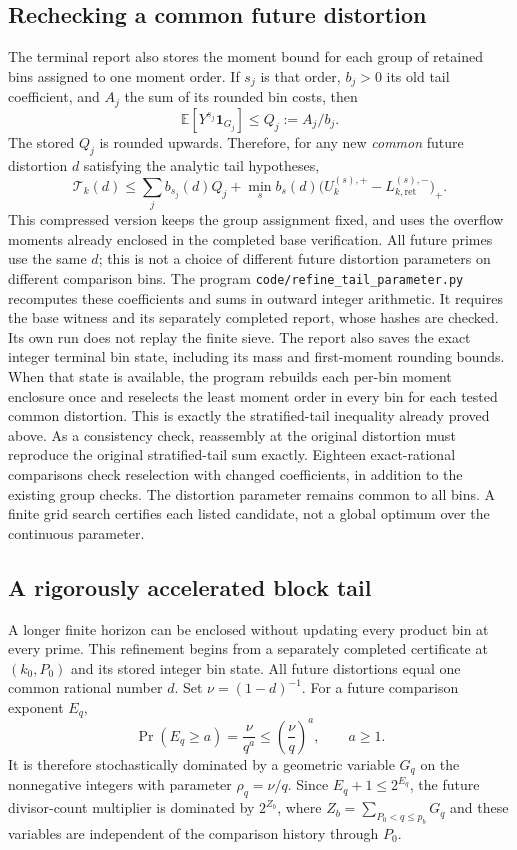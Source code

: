 \documentclass[11pt]{article}
\newcommand{\E}{\mathbb E}
\begin{document}
\subsection{Rechecking a common future distortion}
The terminal report also stores the moment bound for each group of retained
bins assigned to one moment order. If $s_j$ is that order, $b_j>0$ its
old tail coefficient, and $A_j$ the sum of its rounded bin costs, then
\[
 \E[Y^{s_j}\mathbf1_{G_j}]\leq Q_j:=A_j/b_j.
\]
The stored $Q_j$ is rounded upwards. Therefore, for any new \emph{common}
future distortion $d$ satisfying the analytic tail hypotheses,
\[
 \mathcal T_k(d)\leq\sum_j b_{s_j}(d)Q_j+
 \min_s b_s(d)\bigl(U_k^{(s),+}-L_{k,\mathrm{ret}}^{(s),-}\bigr)_+.
\]
This compressed version keeps the group assignment fixed, and uses the
overflow moments already enclosed in the completed base verification. All future primes
use the same $d$; this is not a choice of different future distortion
parameters on different comparison bins. The program
\texttt{code/refine\_tail\_parameter.py} recomputes these coefficients
and sums in outward integer arithmetic. It requires the base witness and
its separately completed report, whose hashes are checked. Its own run
does not replay the finite sieve. The report also saves the exact integer terminal bin state, including its
mass and first-moment rounding bounds. When that state is available, the
program rebuilds each per-bin moment enclosure once and reselects the least
moment order in every bin for each tested common distortion. This is exactly
the stratified-tail inequality already proved above. As a consistency check,
reassembly at the original distortion must reproduce the original
stratified-tail sum exactly. Eighteen exact-rational comparisons check
reselection with changed coefficients, in addition to the existing group
checks. The distortion parameter remains common to all bins.
A finite grid search certifies each
listed candidate, not a global optimum over the continuous parameter.

\subsection{A rigorously accelerated block tail}\label{sec:blocktail}
A longer finite horizon can be enclosed without updating every product
bin at every prime. This refinement begins from a separately completed
certificate at $(k_0,P_0)$ and its stored integer bin state. All future
distortions equal one common rational number $d$. Set $\nu=(1-d)^{-1}$.
For a future comparison exponent $E_q$,
\[
 \Pr(E_q\geq a)=\frac{\nu}{q^a}
 \leq\left(\frac{\nu}{q}\right)^a,\qquad a\geq1.
\]
It is therefore stochastically dominated by a geometric variable $G_q$
on the nonnegative integers with parameter $\rho_q=\nu/q$. Since
$E_q+1\leq2^{E_q}$, the future divisor-count multiplier is dominated by
$2^{Z_b}$, where $Z_b=\sum_{P_0<q\leq p_b}G_q$ and these variables are
independent of the comparison history through $P_0$.
\end{document}

